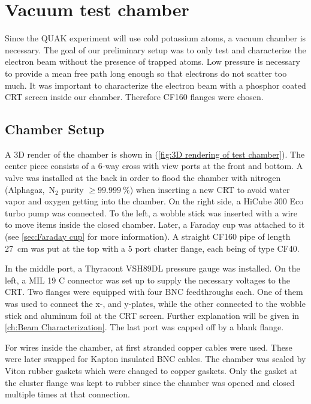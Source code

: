 
\chapter{Vacuum test chamber}
\label{ch:Vacuum chamber}

Since the QUAK experiment will use cold potassium atoms, a vacuum chamber is necessary. The goal of our preliminary setup was to only test and characterize the electron beam without the presence of trapped atoms. Low pressure is necessary to provide a mean free path long enough so that electrons do not scatter too much. It was important to characterize the electron beam with a phosphor coated CRT screen inside our chamber. Therefore CF160 flanges were chosen. 


\section{Chamber Setup}
\label{sec:Chamber Setup}

A 3D render of the chamber is shown in (\cref{fig:3D rendering of test chamber}). The center piece consists of a 6-way cross with view ports at the front and bottom. A valve was installed at the back in order to flood the chamber with nitrogen (Alphagaz\texttrademark,~N$_2$ purity $\ge\SI{99.999}{\percent}$) when inserting a new CRT to avoid water vapor and oxygen getting into the chamber. On the right side, a HiCube 300 Eco turbo pump was connected. To the left, a wobble stick was inserted with a wire to move items inside the closed chamber. Later, a Faraday cup was attached to it (see \cref{sec:Faraday cup} for more information). A straight CF160 pipe of length \SI{27}{\centi\meter} was put at the top with a 5 port cluster flange, each being of type CF40.
 
In the middle port, a Thyracont VSH89DL pressure gauge was installed. On the left, a MIL 19 C connector was set up to supply the necessary voltages to the CRT. Two flanges were equipped with four BNC feedthroughs each. One of them was used to connect the x-, and y-plates, while the other connected to the wobble stick and aluminum foil at the CRT screen. Further explanation will be given in \cref{ch:Beam Characterization}. The last port was capped off by a blank flange.
 
For wires inside the chamber, at first stranded copper cables were used. These were later swapped for Kapton insulated BNC cables. The chamber was sealed by Viton rubber gaskets which were changed to copper gaskets. Only the gasket at the cluster flange was kept to rubber since the chamber was opened and closed multiple times at that connection.
 
